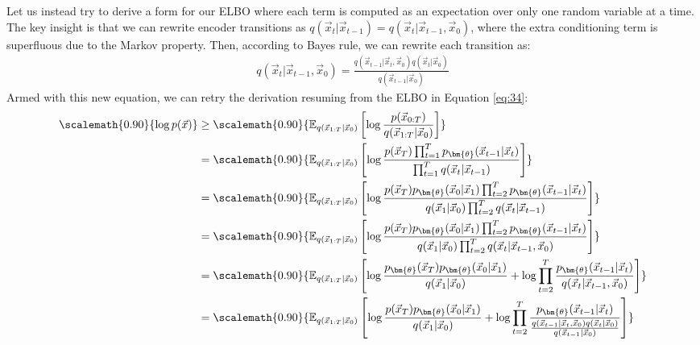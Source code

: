 Let us instead try to derive a form for our ELBO where each term is computed as an expectation over only one random variable at a time.  The key insight is that we can rewrite encoder transitions as $q(\vec{x}_t|\vec{x}_{t-1}) = q(\vec{x}_t|\vec{x}_{t-1}, \vec{x}_0)$, where the extra conditioning term is superfluous due to the Markov property.  Then, according to Bayes rule, we can rewrite each transition as: 
\begin{align}
q(\vec{x}_t | \vec{x}_{t-1}, \vec{x}_0) = \frac{q(\vec{x}_{t-1}|\vec{x}_t, \vec{x}_0)q(\vec{x}_t|\vec{x}_0)}{q(\vec{x}_{t-1}|\vec{x}_0)}
\end{align}
Armed with this new equation, we can retry the derivation resuming from the ELBO in Equation \ref{eq:34}:
\begingroup
\allowdisplaybreaks
\begin{align}
\scalemath{0.90}{\log p(\vec{x})}
&\geq \scalemath{0.90}{\mathbb{E}_{q(\vec{x}_{1:T}|\vec{x}_0)}\left[\log \frac{p(\vec{x}_{0:T})}{q(\vec{x}_{1:T}|\vec{x}_0)}\right]}\\
&= \scalemath{0.90}{\mathbb{E}_{q(\vec{x}_{1:T}|\vec{x}_0)}\left[\log \frac{p(\vec{x}_T)\prod_{t=1}^{T}p_{\bm{\theta}}(\vec{x}_{t-1}|\vec{x}_t)}{\prod_{t = 1}^{T}q(\vec{x}_{t}|\vec{x}_{t-1})}\right]}\\
&= \scalemath{0.90}{\mathbb{E}_{q(\vec{x}_{1:T}|\vec{x}_0)}\left[\log \frac{p(\vec{x}_T)p_{\bm{\theta}}(\vec{x}_0|\vec{x}_1)\prod_{t=2}^{T}p_{\bm{\theta}}(\vec{x}_{t-1}|\vec{x}_t)}{q(\vec{x}_1|\vec{x}_0)\prod_{t = 2}^{T}q(\vec{x}_{t}|\vec{x}_{t-1})}\right]}\\
&= \scalemath{0.90}{\mathbb{E}_{q(\vec{x}_{1:T}|\vec{x}_0)}\left[\log \frac{p(\vec{x}_T)p_{\bm{\theta}}(\vec{x}_0|\vec{x}_1)\prod_{t=2}^{T}p_{\bm{\theta}}(\vec{x}_{t-1}|\vec{x}_t)}{q(\vec{x}_1|\vec{x}_0)\prod_{t = 2}^{T}q(\vec{x}_{t}|\vec{x}_{t-1}, \vec{x}_0)}\right]}\\
&= \scalemath{0.90}{\mathbb{E}_{q(\vec{x}_{1:T}|\vec{x}_0)}\left[\log \frac{p_{\bm{\theta}}(\vec{x}_T)p_{\bm{\theta}}(\vec{x}_0|\vec{x}_1)}{q(\vec{x}_1|\vec{x}_0)} + \log \prod_{t=2}^{T}\frac{p_{\bm{\theta}}(\vec{x}_{t-1}|\vec{x}_t)}{q(\vec{x}_{t}|\vec{x}_{t-1}, \vec{x}_0)}\right]}\\
&= \scalemath{0.90}{\mathbb{E}_{q(\vec{x}_{1:T}|\vec{x}_0)}\left[\log \frac{p(\vec{x}_T)p_{\bm{\theta}}(\vec{x}_0|\vec{x}_1)}{q(\vec{x}_1|\vec{x}_0)} + \log \prod_{t=2}^{T}\frac{p_{\bm{\theta}}(\vec{x}_{t-1}|\vec{x}_t)}{\frac{q(\vec{x}_{t-1}|\vec{x}_{t}, \vec{x}_0)q(\vec{x}_t|\vec{x}_0)}{q(\vec{x}_{t-1}|\vec{x}_0)}}\right]}\\

\end{align}

